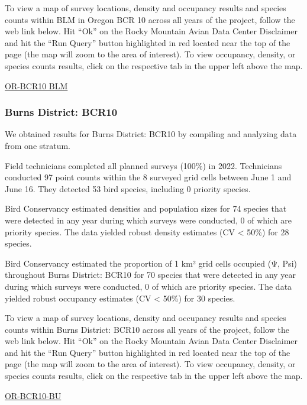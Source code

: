 \documentclass[
  letterpaper,
  DIV=11,
  numbers=noendperiod,
  oneside]{scrreprt}
\begin{document}
To view a map of survey locations, density and occupancy results and
species counts within BLM in Oregon BCR 10 across all years of the
project, follow the web link below. Hit ``Ok'' on the Rocky Mountain
Avian Data Center Disclaimer and hit the ``Run Query'' button
highlighted in red located near the top of the page (the map will zoom
to the area of interest). To view occupancy, density, or species counts
results, click on the respective tab in the upper left above the map.

\href{http://www.rmbo.org/new_site/adc/QueryWindow.aspx\#N4IgzgrgDgpgTmALnAhoiBbEAuABCAeQCUBaAIQGEiBGABlzIBkBZEAXyA==}{OR-BCR10
BLM}

\hypertarget{burns-district-bcr10}{%
\subsubsection{Burns District: BCR10}\label{burns-district-bcr10}}

We obtained results for Burns District: BCR10 by compiling and analyzing
data from one stratum.

Field technicians completed all planned surveys (100\%) in 2022.
Technicians conducted 97 point counts within the 8 surveyed grid cells
between June 1 and June 16. They detected 53 bird species, including 0
priority species.

Bird Conservancy estimated densities and population sizes for 74 species
that were detected in any year during which surveys were conducted, 0 of
which are priority species. The data yielded robust density estimates
(CV \textless{} 50\%) for 28 species.

Bird Conservancy estimated the proportion of 1 km² grid cells occupied
(Ψ, Psi) throughout Burns District: BCR10 for 70 species that were
detected in any year during which surveys were conducted, 0 of which are
priority species. The data yielded robust occupancy estimates (CV
\textless{} 50\%) for 30 species.

To view a map of survey locations, density and occupancy results and
species counts within Burns District: BCR10 across all years of the
project, follow the web link below. Hit ``Ok'' on the Rocky Mountain
Avian Data Center Disclaimer and hit the ``Run Query'' button
highlighted in red located near the top of the page (the map will zoom
to the area of interest). To view occupancy, density, or species counts
results, click on the respective tab in the upper left above the map.

\href{http://www.rmbo.org/new_site/adc/QueryWindow.aspx\#N4IgzgLgTghhCuBbEAuABCA8gJQLQCEBhbARgAYCBVdfeKAUxnjQHsAzNAGRgDsATNAFleMAOb1E9HhFxpaUHmDQARAJaQoqgMYQQAXyA===}{OR-BCR10-BU}
\end{document}
